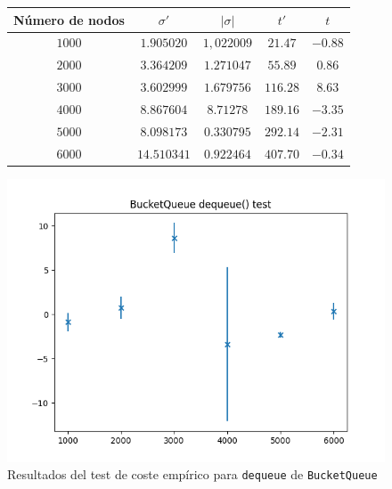 \documentclass[a4paper, 12pt]{article}
\begin{document}
                \begin{figure}[ht!]
                    \centering
                    \begin{tabular}{|c|c|c|c|c|}
                        \hline
                        \textbf{Número de nodos} & \textbf{$\sigma'$} & \textbf{$|\sigma|$} & \textbf{$t'$}    & \textbf{$t$}      \\\hline
                        $1000$                   & $1.905020$         & $1,022009$          & $21.47$         & $-0.88$        \\\hline
                        $2000$                   & $3.364209$         & $1.271047$         & $55.89$         & $0.86$        \\\hline
                        $3000$                   & $3.602999$         & $1.679756$           & $116.28$        & $8.63$       \\\hline
                        $4000$                   & $8.867604$         & $8.71278$          & $189.16$        & $-3.35$       \\\hline
                        $5000$                   & $8.098173$         & $0.330795$         & $292.14$        & $-2.31$        \\\hline
                        $6000$                   & $14.510341$        & $0.922464$          & $407.70$        & $-0.34$       \\\hline                  
                    \end{tabular}
                    \includegraphics[]{img/costemp_bq_deq.png}
                    \caption{Resultados del test de coste empírico para 
                    \texttt{dequeue} de \texttt{BucketQueue}}
                    \label{f:deq_bq_test}
                \end{figure}
\end{document}
